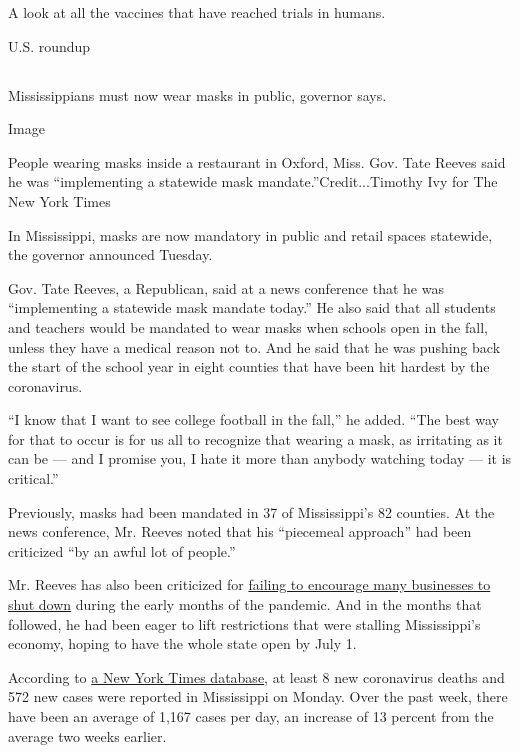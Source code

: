 A look at all the vaccines that have reached trials in humans.

U.S. roundup

\hypertarget{-2}{%
\subsection{}\label{-2}}

Mississippians must now wear masks in public, governor says.

Image

People wearing masks inside a restaurant in Oxford, Miss. Gov. Tate
Reeves said he was ``implementing a statewide mask
mandate.''Credit...Timothy Ivy for The New York Times

In Mississippi, masks are now mandatory in public and retail spaces
statewide, the governor announced Tuesday.

Gov. Tate Reeves, a Republican, said at a news conference that he was
``implementing a statewide mask mandate today.'' He also said that all
students and teachers would be mandated to wear masks when schools open
in the fall, unless they have a medical reason not to. And he said that
he was pushing back the start of the school year in eight counties that
have been hit hardest by the coronavirus.

``I know that I want to see college football in the fall,'' he added.
``The best way for that to occur is for us all to recognize that wearing
a mask, as irritating as it can be --- and I promise you, I hate it more
than anybody watching today --- it is critical.''

Previously, masks had been mandated in 37 of Mississippi's 82 counties.
At the news conference, Mr. Reeves noted that his ``piecemeal approach''
had been criticized ``by an awful lot of people.''

Mr. Reeves has also been criticized for
\href{https://www.nytimes3xbfgragh.onion/2020/03/26/us/mississippi-coronavirus-essential-businesses-tate-reeves.html}{failing
to encourage many businesses to shut down} during the early months of
the pandemic. And in the months that followed, he had been eager to lift
restrictions that were stalling Mississippi's economy, hoping to have
the whole state open by July 1.

According to
\href{https://www.nytimes3xbfgragh.onion/interactive/2020/us/mississippi-coronavirus-cases.html}{a
New York Times database}, at least 8 new coronavirus deaths and 572 new
cases were reported in Mississippi on Monday. Over the past week, there
have been an average of 1,167 cases per day, an increase of 13 percent
from the average two weeks earlier.

